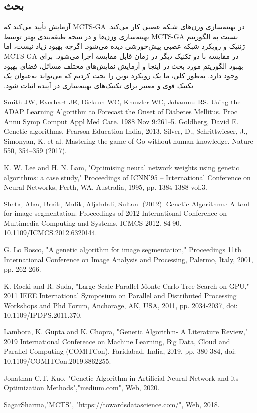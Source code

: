 \documentclass[11pt]{article}
\begin{document}
\begin{multicols}{2}
		\section{بحث}
		آزمایش تأیید می‌کند که‎ MCTS-GA ‎در بهینه‌سازی وزن‌های شبکه ‏عصبی کار می‌کند. بهینه‌سازی وزن‌ها و در نتیجه طبقه‌بندی بهتر توسط‎ ‎MCTS-GA ‎نسبت به الگوریتم ژنتیک و رویکرد شبکه عصبی ‏پیش‌خورشی دیده می‌شود. اگرچه بهبود زیاد نیست، اما‎ MCTS-GA ‎در مقایسه با دو تکنیک دیگر در زمان قابل مقایسه اجرا می‌شود. برای ‏بهبود الگوریتم مورد بحث در اینجا و آزمایش نمایش‌های مختلف مسائل، ‏فضای بهبود وجود دارد. به‌طور کلی، ما یک رویکرد نوین را بحث کردیم ‏که می‌تواند به‌عنوان یک تکنیک قوی و معتبر برای تکنیک‌های ‏بهینه‌سازی در آینده اثبات شود.‏
    \renewcommand{\refname}{مراجع}
		\begin{LTR}
			\begin{thebibliography}{99} 
				
				 Smith JW, Everhart JE, Dickson WC, Knowler WC, Johannes RS. Using the ADAP Learning Algorithm to Forecast the Onset of Diabetes Mellitus. Proc Annu Symp Comput Appl Med Care. 1988 Nov 9:261–5.
				 Goldberg, David E. Genetic algorithms. Pearson Education India, 2013.
				 Silver, D., Schrittwieser, J., Simonyan, K. et al. Mastering the game of Go without human knowledge. Nature 550, 354–359 (2017).
				
				 K. W. Lee and H. N. Lam, "Optimising neural network weights using genetic algorithms: a case study," Proceedings of ICNN'95 – International Conference on Neural Networks, Perth, WA, Australia, 1995, pp. 1384-1388 vol.3.
				
				 Sheta, Alaa, Braik, Malik, Aljahdali, Sultan. (2012). Genetic Algorithms: A tool for image segmentation. Proceedings of 2012 International Conference on Multimedia Computing and Systems, ICMCS 2012. 84-90. 10.1109/ICMCS.2012.6320144.
				
				 G. Lo Bosco, "A genetic algorithm for image segmentation," Proceedings 11th International Conference on Image Analysis and Processing, Palermo, Italy, 2001, pp. 262-266.
				
				 K. Rocki and R. Suda, "Large-Scale Parallel Monte Carlo Tree Search on GPU," 2011 IEEE International Symposium on Parallel and Distributed Processing Workshops and Phd Forum, Anchorage, AK, USA, 2011, pp. 2034-2037, doi: 10.1109/IPDPS.2011.370.
				
				 Lambora, K. Gupta and K. Chopra, "Genetic Algorithm- A Literature Review," 2019 International Conference on Machine Learning, Big Data, Cloud and Parallel Computing (COMITCon), Faridabad, India, 2019, pp. 380-384, doi: 10.1109/COMITCon.2019.8862255.
				
				 Jonathan C.T. Kuo, "Genetic Algorithm in Artificial Neural Network and its Optimization Methods","medium.com", Web, 2020.
				
				SagarSharma,"MCTS",
				"https://towardsdatascience.com/", Web, 2018.
				
			\end{thebibliography}
		\end{LTR}
	\end{multicols}
\end{document}
